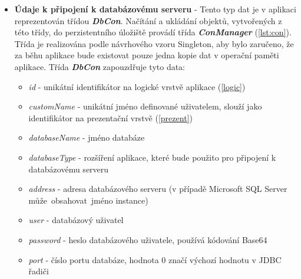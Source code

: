\documentclass[czech,bachelor,public,dept460,male,cpdeclaration,twoside]{diploma}
\begin{document}
\begin{itemize}
  \item \textbf{Údaje k připojení k databázovému serveru} - Tento typ dat je v aplikaci reprezentován třídou \textbf{\emph{DbCon}}. Načítání a ukládání objektů, vytvořených z této třídy, do perzistentního úložiště provádí třída \textbf{\emph{ConManager}} (\ref{lst:con}). Třída je realizována podle návrhového vzoru Singleton, aby bylo zaručeno, že za běhu aplikace bude existovat pouze jedna kopie dat v operační paměti aplikace. Třída \textbf{\emph{DbCon}} zapouzdřuje tyto data:
  \begin{itemize}
  	\item \textit{id} - unikátní identifikátor na logické vrstvě aplikace (\ref{logic})
  	\item \textit{customName} - unikátní jméno definované uživatelem, slouží jako identifikátor na prezentační vrstvě (\ref{prezent})
  	\item \textit{databaseName} - jméno databáze
  	\item \textit{databaseType} - rozšíření aplikace, které bude použito pro připojení k databázovému serveru
  	\item \textit{address} - adresa databázového serveru (v případě Microsoft SQL Server může~obsahovat~jméno instance)
  	\item \textit{user} - databázový uživatel
  	\item \textit{password} - heslo databázového uživatele, používá kódování Base64
  	\item \textit{port} - číslo portu databáze, hodnota 0 značí výchozí hodnotu v JDBC řadiči
  \end{itemize}
  

\end{itemize}
\end{document}
